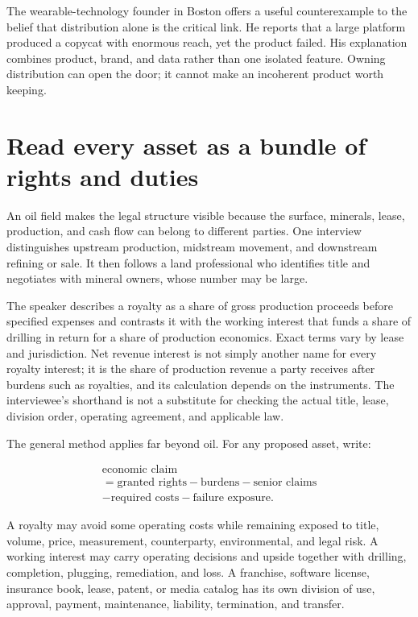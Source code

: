 The wearable-technology founder in Boston offers a useful counterexample to
the belief that distribution alone is the critical link. He reports that a
large platform produced a copycat with enormous reach, yet the product failed.
His explanation combines product, brand, and data rather than one isolated
feature. Owning distribution can open the door; it cannot make an incoherent
product worth keeping.

\section{Read every asset as a bundle of rights and duties}

An oil field makes the legal structure visible because the surface, minerals,
lease, production, and cash flow can belong to different parties. One interview
distinguishes upstream production, midstream movement, and downstream refining
or sale. It then follows a land professional who identifies title and
negotiates with mineral owners, whose number may be large.

The speaker describes a royalty as a share of gross production proceeds before
specified expenses and contrasts it with the working interest that funds a
share of drilling in return for a share of production economics. Exact terms
vary by lease and jurisdiction. Net revenue interest is not simply another
name for every royalty interest; it is the share of production revenue a party
receives after burdens such as royalties, and its calculation depends on the
instruments. The interviewee's shorthand is not a substitute for checking the
actual title, lease, division order, operating agreement, and applicable law.

The general method applies far beyond oil. For any proposed asset, write:

\begin{equation}
\begin{gathered}
\text{economic claim}\\
=\text{granted rights}-\text{burdens}-\text{senior claims}\\
-\text{required costs}-\text{failure exposure}.
\end{gathered}
\end{equation}

A royalty may avoid some operating costs while remaining exposed to title,
volume, price, measurement, counterparty, environmental, and legal risk. A
working interest may carry operating decisions and upside together with
drilling, completion, plugging, remediation, and loss. A franchise, software
license, insurance book, lease, patent, or media catalog has its own division
of use, approval, payment, maintenance, liability, termination, and transfer.

